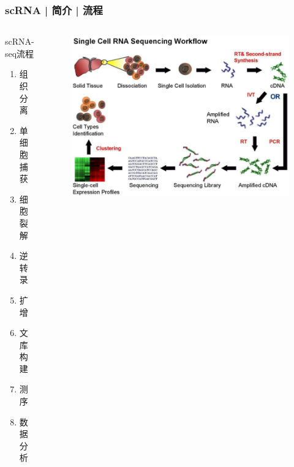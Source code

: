 \documentclass[11pt]{ctexbeamer}
\begin{document}
\begin{frame}
  \frametitle{scRNA | 简介 |  流程}
  \begin{columns}
  \begin{block}{scRNA-seq流程}
  \begin{enumerate}
    \item 组织分离
    \item 单细胞捕获
    \item 细胞裂解
    \item 逆转录
    \item 扩增
    \item 文库构建
    \item 测序
    \item 数据分析
  \end{enumerate}
  \end{block}
   \begin{figure}
    \centering
    \includegraphics[width=\textwidth]{scRNA_workflow_01.png}
  \end{figure}
  \end{columns}
\end{frame}
\end{document}
